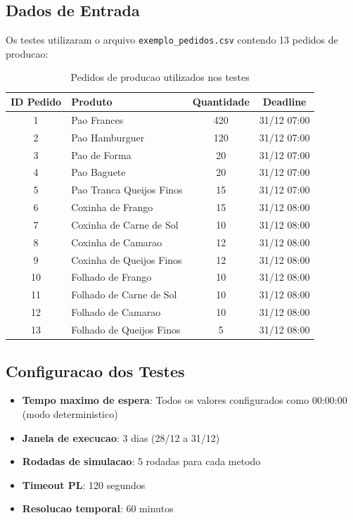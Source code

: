 \documentclass[12pt,a4paper]{article}
\begin{document}
\subsection{Dados de Entrada}

Os testes utilizaram o arquivo \texttt{exemplo\_pedidos.csv} contendo 13 pedidos de producao:

\begin{table}[H]
\centering
\caption{Pedidos de producao utilizados nos testes}
\begin{tabular}{clcc}
\toprule
\textbf{ID Pedido} & \textbf{Produto} & \textbf{Quantidade} & \textbf{Deadline} \\
\midrule
1 & Pao Frances & 420 & 31/12 07:00 \\
2 & Pao Hamburguer & 120 & 31/12 07:00 \\
3 & Pao de Forma & 20 & 31/12 07:00 \\
4 & Pao Baguete & 20 & 31/12 07:00 \\
5 & Pao Tranca Queijos Finos & 15 & 31/12 07:00 \\
6 & Coxinha de Frango & 15 & 31/12 08:00 \\
7 & Coxinha de Carne de Sol & 10 & 31/12 08:00 \\
8 & Coxinha de Camarao & 12 & 31/12 08:00 \\
9 & Coxinha de Queijos Finos & 12 & 31/12 08:00 \\
10 & Folhado de Frango & 10 & 31/12 08:00 \\
11 & Folhado de Carne de Sol & 10 & 31/12 08:00 \\
12 & Folhado de Camarao & 10 & 31/12 08:00 \\
13 & Folhado de Queijos Finos & 5 & 31/12 08:00 \\
\bottomrule
\end{tabular}
\end{table}

\subsection{Configuracao dos Testes}

\begin{itemize}
    \item \textbf{Tempo maximo de espera}: Todos os valores configurados como 00:00:00 (modo deterministico)
    \item \textbf{Janela de execucao}: 3 dias (28/12 a 31/12)
    \item \textbf{Rodadas de simulacao}: 5 rodadas para cada metodo
    \item \textbf{Timeout PL}: 120 segundos
    \item \textbf{Resolucao temporal}: 60 minutos
\end{itemize}
\end{document}
